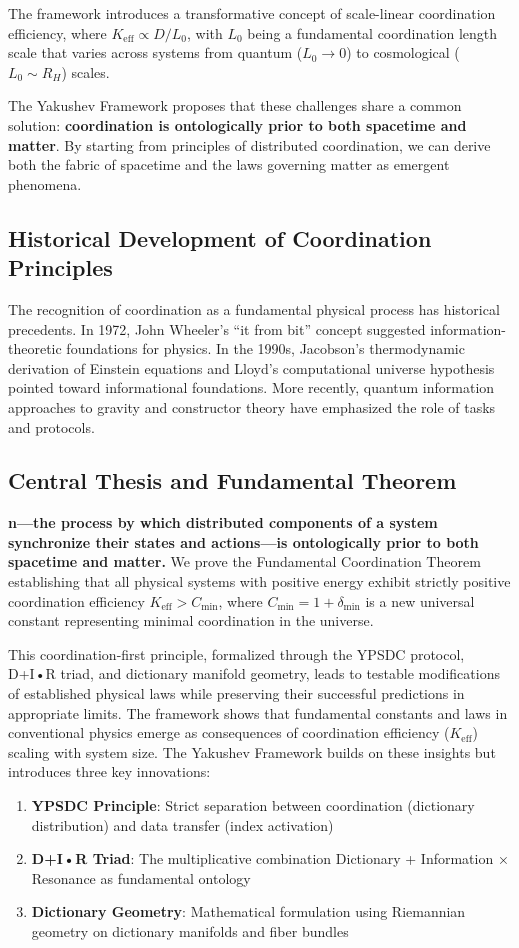 \documentclass[11pt,a4paper]{article}
\begin{document}
	The framework introduces a transformative concept of scale-linear coordination efficiency,
	where $K_{\mathrm{eff}} \propto D/L_0$, with $L_0$ being a fundamental 
	coordination length scale that varies across systems from quantum ($L_0 \to 0$) 
	to cosmological ($L_0 \sim R_H$) scales.
	
	
	The Yakushev Framework proposes that these challenges share a common solution: \textbf{coordination is ontologically prior to both spacetime and matter}. By starting from principles of distributed coordination, we can derive both the fabric of spacetime and the laws governing matter as emergent phenomena.
	
	\subsection{Historical Development of Coordination Principles}
	The recognition of coordination as a fundamental physical process has historical precedents. In 1972, John Wheeler's ``it from bit'' concept suggested information-theoretic foundations for physics. In the 1990s, Jacobson's thermodynamic derivation of Einstein equations and Lloyd's computational universe hypothesis pointed toward informational foundations. More recently, quantum information approaches to gravity and constructor theory have emphasized the role of tasks and protocols.
	\subsection{Central Thesis and Fundamental Theorem}
	
	\textbf{n—the process by which distributed components of a system synchronize their states and actions—is ontologically prior to both spacetime and matter.} We prove the Fundamental Coordination Theorem establishing that all physical systems with positive energy exhibit strictly positive coordination efficiency $K_{\mathrm{eff}} > C_{\min}$, where $C_{\min} = 1 + \delta_{\min}$ is a new universal constant representing minimal coordination in the universe.
	
	This coordination-first principle, formalized through the YPSDC protocol, D+I•R triad, and dictionary manifold geometry, leads to testable modifications of established physical laws while preserving their successful predictions in appropriate limits. The framework shows that fundamental constants and laws in conventional physics emerge as consequences of coordination efficiency ($K_{\mathrm{eff}}$) scaling with system size.
	The Yakushev Framework builds on these insights but introduces three key innovations:
	\begin{enumerate}
		\item \textbf{YPSDC Principle}: Strict separation between coordination (dictionary distribution) and data transfer (index activation)
		\item \textbf{D+I•R Triad}: The multiplicative combination Dictionary + Information × Resonance as fundamental ontology
		\item \textbf{Dictionary Geometry}: Mathematical formulation using Riemannian geometry on dictionary manifolds and fiber bundles
	\end{enumerate}
	
\end{document}
